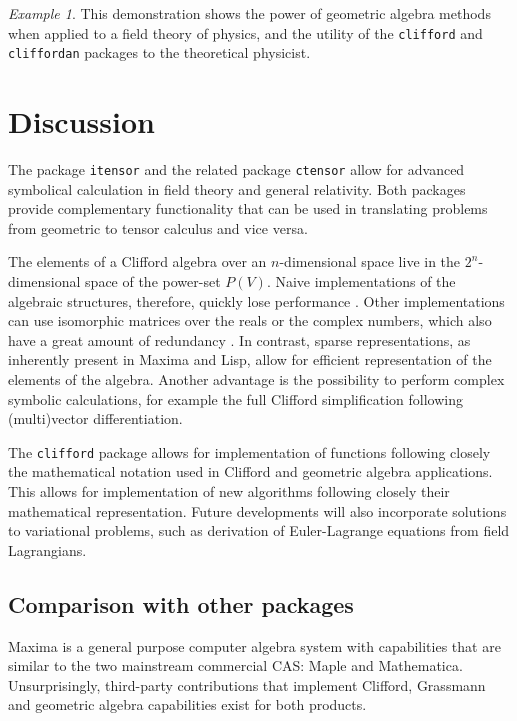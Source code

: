 \documentclass[twoside,reqno,11pt]{amsart}
\theoremstyle{definition}
\theoremstyle{remark}
\newtheorem*{ex}{Example}
\numberwithin{equation}{section}
\newcommand{\symb}[1]{{\tt #1}}
\begin{document}
\begin{ex}
This demonstration shows the power of geometric algebra methods when applied to a field theory of physics, and the utility of the \symb{clifford} and \symb{cliffordan} packages to the theoretical physicist.
\end{ex}

\section{Discussion}
\label{sec:disc}

The package \symb{itensor} and the related package \symb{ctensor} allow for advanced symbolical calculation in field theory and general relativity.
Both packages provide complementary functionality that can be used in translating problems from geometric   to tensor calculus and vice versa.

The elements of a Clifford algebra over an $n$-dimensional space live in the $2^n$-dimensional space of the power-set $P(V)$.
Naive implementations of the algebraic structures, therefore, quickly lose performance \cite{Fontijne2007}. Other implementations can use isomorphic matrices over the reals or the complex numbers, which also have a great amount of redundancy \cite{Dorst2007}.
In contrast, sparse representations, as inherently present in Maxima and Lisp, allow for efficient representation of the elements of the algebra.
Another advantage is the possibility to perform complex symbolic calculations, for example the full Clifford simplification following (multi)vector differentiation.

The \symb{clifford} package allows for implementation of functions following closely the mathematical notation used in Clifford and geometric algebra applications.
This allows for implementation of new algorithms following closely their mathematical representation.
Future developments will also incorporate solutions to variational problems, such as derivation of
Euler-Lagrange equations from field Lagrangians.

\subsection{Comparison with other packages}
\label{sec:comp}

Maxima is a general purpose computer algebra system with capabilities that are similar to the two mainstream commercial CAS: Maple and Mathematica.
Unsurprisingly, third-party contributions that implement Clifford, Grassmann and geometric algebra capabilities exist for both products.
\end{document}
